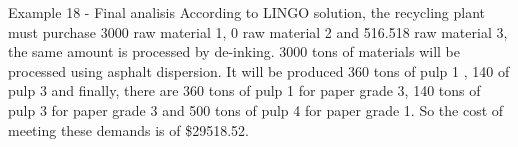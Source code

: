 \begin{frame}{Example 18 - Final analisis}
According to LINGO solution, the recycling plant must purchase 3000 raw material 1, 0 raw material 2
and 516.518 raw material 3, the same amount is processed by de-inking. 3000 tons of materials will be processed
using asphalt dispersion. It will be produced 360 tons of pulp 1 , 140 of pulp 3 and finally, there are
360 tons of pulp 1 for paper grade 3, 140 tons of pulp 3 for paper grade 3 and 500 tons of pulp 4
for paper grade 1. So the cost of meeting these demands is of \$29518.52.
\end{frame}
